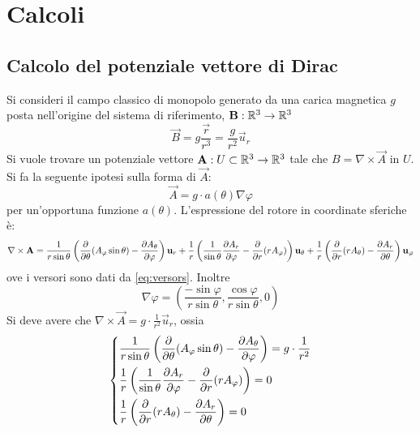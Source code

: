 \section{Calcoli}
\subsection{Calcolo del potenziale vettore di Dirac}
\label{sec:dirac_potential}
Si consideri il campo classico di monopolo generato da una carica magnetica $g$ posta
nell'origine del sistema di riferimento, $\vec B : \R ^3 \to \R ^3$
    $$ \vec B = g\frac{\vec r}{r^3} = \frac{g}{r^2} \vec u _r $$
Si vuole trovare un potenziale vettore $\vec A : U \subset \R ^3 \to \R ^3$ tale che
$ B = \nabla \times \vec A $ in $U$. Si fa la seguente ipotesi sulla forma di $\vec A$:
   $$ \vec A = g \cdot a(\theta) \nabla \varphi $$
per un'opportuna funzione $a(\theta)$.
L'espressione del rotore in coordinate sferiche è:
$$
    \nabla \times \vec A =
         \frac{1}{r\sin\theta} \left(
              \frac{\partial}{\partial\theta}(A_\varphi\sin\theta) -
              \frac{\partial A_\theta}{\partial\varphi}
              \right) \vec u _r \\
         + \frac{1}{r} \left(
              \frac{1}{\sin\theta}\frac{\partial A_r}{\partial\varphi} -
              \frac{\partial}{\partial r}(r A_\varphi)
              \right)\vec u _\theta \\
         + \frac{1}{r} \left(
              \frac{\partial}{\partial r}(r A_\theta) - \frac{\partial A_r}{\partial\theta}
              \right)\vec u _\varphi
$$
ove i versori sono dati da \ref{eq:versors}. Inoltre
$$
   \nabla \varphi = \left( \frac{-\sin\varphi}{r\sin\theta},\frac{\cos\varphi}{r\sin\theta},0 \right)
$$
Si deve avere che $ \nabla \times \vec A = g \cdot \frac{1}{r^2} \vec u _r$,
ossia
\begin{equation*}
   \begin{dcases}
       \frac{1}{r\sin\theta} \left(
            \frac{\partial}{\partial\theta}(A_\varphi\sin\theta) -
            \frac{\partial A_\theta}{\partial\varphi}
            \right) = g \cdot \frac{1}{r^2} \\
       \frac{1}{r} \left(
            \frac{1}{\sin\theta}\frac{\partial A_r}{\partial\varphi} -
            \frac{\partial}{\partial r}(r A_\varphi)
            \right) = 0 \\
       \frac{1}{r} \left(
            \frac{\partial}{\partial r}(r A_\theta) - \frac{\partial A_r}{\partial\theta}
            \right) = 0
   \end{dcases}
\end{equation*}
